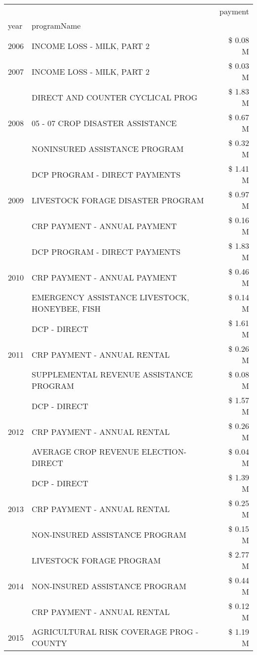 \begin{tabular}{llr}
\toprule
 &  & payment \\
year & programName &  \\
\midrule
2006 & INCOME LOSS - MILK, PART 2 & \$ 0.08 M \\
\cline{1-3}
2007 & INCOME LOSS - MILK, PART 2 & \$ 0.03 M \\
\cline{1-3}
\multirow[t]{3}{*}{2008} & DIRECT AND COUNTER CYCLICAL PROG & \$ 1.83 M \\
 & 05 - 07 CROP DISASTER ASSISTANCE & \$ 0.67 M \\
 & NONINSURED ASSISTANCE PROGRAM & \$ 0.32 M \\
\cline{1-3}
\multirow[t]{3}{*}{2009} & DCP PROGRAM - DIRECT PAYMENTS & \$ 1.41 M \\
 & LIVESTOCK FORAGE DISASTER  PROGRAM & \$ 0.97 M \\
 & CRP PAYMENT - ANNUAL PAYMENT & \$ 0.16 M \\
\cline{1-3}
\multirow[t]{3}{*}{2010} & DCP PROGRAM - DIRECT PAYMENTS & \$ 1.83 M \\
 & CRP PAYMENT - ANNUAL PAYMENT & \$ 0.46 M \\
 & EMERGENCY ASSISTANCE LIVESTOCK, HONEYBEE, FISH & \$ 0.14 M \\
\cline{1-3}
\multirow[t]{3}{*}{2011} & DCP - DIRECT & \$ 1.61 M \\
 & CRP PAYMENT - ANNUAL RENTAL & \$ 0.26 M \\
 & SUPPLEMENTAL REVENUE ASSISTANCE PROGRAM & \$ 0.08 M \\
\cline{1-3}
\multirow[t]{3}{*}{2012} & DCP - DIRECT & \$ 1.57 M \\
 & CRP PAYMENT - ANNUAL RENTAL & \$ 0.26 M \\
 & AVERAGE CROP REVENUE ELECTION-DIRECT & \$ 0.04 M \\
\cline{1-3}
\multirow[t]{3}{*}{2013} & DCP - DIRECT & \$ 1.39 M \\
 & CRP PAYMENT - ANNUAL RENTAL & \$ 0.25 M \\
 & NON-INSURED ASSISTANCE PROGRAM & \$ 0.15 M \\
\cline{1-3}
\multirow[t]{3}{*}{2014} & LIVESTOCK FORAGE PROGRAM & \$ 2.77 M \\
 & NON-INSURED ASSISTANCE PROGRAM & \$ 0.44 M \\
 & CRP PAYMENT - ANNUAL RENTAL & \$ 0.12 M \\
\cline{1-3}
\multirow[t]{3}{*}{2015} & AGRICULTURAL RISK COVERAGE PROG - COUNTY & \$ 1.19 M \\

\end{tabular}

